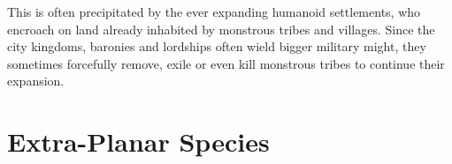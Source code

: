 This is often precipitated by the ever expanding humanoid settlements, who
encroach on land already inhabited by monstrous tribes and villages. Since the
city kingdoms, baronies and lordships often wield bigger military might, they
sometimes forcefully remove, exile or even kill monstrous tribes to continue
their expansion.











\section{Extra-Planar Species}
\label{sec:ExtraPlanar Species}







